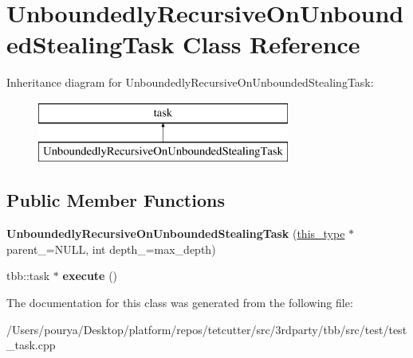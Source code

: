\hypertarget{classUnboundedlyRecursiveOnUnboundedStealingTask}{}\section{Unboundedly\+Recursive\+On\+Unbounded\+Stealing\+Task Class Reference}
\label{classUnboundedlyRecursiveOnUnboundedStealingTask}
Inheritance diagram for Unboundedly\+Recursive\+On\+Unbounded\+Stealing\+Task\+:\begin{figure}[H]
\begin{center}
\leavevmode
\includegraphics[height=2.000000cm]{classUnboundedlyRecursiveOnUnboundedStealingTask}
\end{center}
\end{figure}
\subsection*{Public Member Functions}
\begin{DoxyCompactItemize}
\item 
\hypertarget{classUnboundedlyRecursiveOnUnboundedStealingTask_a6ac6aa27c71d1446d7ce5db74176f723}{}{\bfseries Unboundedly\+Recursive\+On\+Unbounded\+Stealing\+Task} (\hyperlink{classUnboundedlyRecursiveOnUnboundedStealingTask}{this\+\_\+type} $\ast$parent\+\_\+=N\+U\+L\+L, int depth\+\_\+=max\+\_\+depth)\label{classUnboundedlyRecursiveOnUnboundedStealingTask_a6ac6aa27c71d1446d7ce5db74176f723}

\item 
\hypertarget{classUnboundedlyRecursiveOnUnboundedStealingTask_a5ebea6a5235c08477ec8606eca78b626}{}tbb\+::task $\ast$ {\bfseries execute} ()\label{classUnboundedlyRecursiveOnUnboundedStealingTask_a5ebea6a5235c08477ec8606eca78b626}

\end{DoxyCompactItemize}


The documentation for this class was generated from the following file\+:\begin{DoxyCompactItemize}
\item 
/\+Users/pourya/\+Desktop/platform/repos/tetcutter/src/3rdparty/tbb/src/test/test\+\_\+task.\+cpp\end{DoxyCompactItemize}
